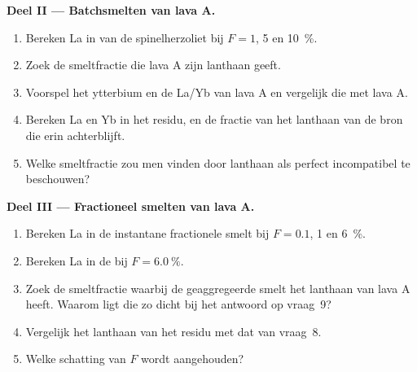\begin{problem}
\medskip\noindent\textbf{Deel II --- Batchsmelten van lava A.}
\begin{enumerate}[resume]
\item Bereken La in  van de spinelherzoliet bij $F = 1$, 5 en
\qty{10}{\percent}.
\item Zoek de smeltfractie die lava A zijn lanthaan geeft.
\item Voorspel het ytterbium en de La/Yb van lava A en vergelijk die met lava A.
\item Bereken La en Yb in het residu, en de fractie van het lanthaan van de bron
die erin achterblijft.
\item Welke smeltfractie zou men vinden door lanthaan als perfect
incompatibel te beschouwen?
\end{enumerate}

\medskip\noindent\textbf{Deel III --- Fractioneel smelten van lava A.}
\begin{enumerate}[resume]
\item Bereken La in de instantane fractionele smelt bij $F = 0.1$, 1 en
\qty{6}{\percent}.
\item Bereken La in de  bij $F = \qty{6.0}{\percent}$.
\item Zoek de smeltfractie waarbij de geaggregeerde smelt het lanthaan van
lava A heeft. Waarom ligt die zo dicht bij het antwoord op vraag~9?
\item Vergelijk het lanthaan van het residu met dat van vraag~8.
\item Welke schatting van $F$ wordt aangehouden?
\end{enumerate}


\end{problem}
